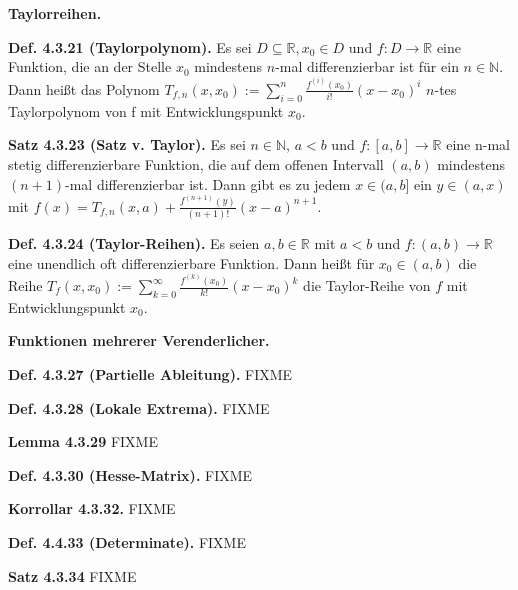 \textbf{Taylorreihen.}

\textbf{Def. 4.3.21 (Taylorpolynom).} Es sei $D\subseteq\mathbb{R},x_{0}\in D$
und $f:D\rightarrow\mathbb{R}$ eine Funktion, die an der Stelle $x_{0}$
mindestens $n$-mal differenzierbar ist für ein $n\in\mathbb{N}.$
Dann heißt das Polynom $T_{f,n}(x,x_{0}):=\sum_{i=0}^{n}\frac{f^{(i)}(x_{0})}{i!}(x-x_{0})^{i}$
$n$-tes Taylorpolynom von f mit Entwicklungspunkt $x_{0}$.

\textbf{Satz 4.3.23 (Satz v. Taylor).} Es sei $n\in\mathbb{N}$, $a<b$
und $f:[a,b]\rightarrow\mathbb{R}$ eine n-mal stetig differenzierbare
Funktion, die auf dem offenen Intervall $(a,b)$ mindestens $(n+1)$-mal
differenzierbar ist. Dann gibt es zu jedem $x\in(a,b]$ ein $y\in(a,x)$
mit $f(x)=T_{f,n}(x,a)+\frac{f^{(n+1)}(y)}{(n+1)!}(x-a)^{n+1}$.


\textbf{Def. 4.3.24 (Taylor-Reihen).} Es seien $a,b\in\mathbb{R}$
mit $a<b$ und $f:(a,b)\rightarrow\mathbb{R}$ eine unendlich oft
differenzierbare Funktion. Dann heißt für $x_{0}\in(a,b)$ die Reihe
$T_{f}(x,x_{0}):=\sum_{k=0}^{\infty}\frac{f^{(k)}(x_{0})}{k!}(x-x_{0})^{k}$
die Taylor-Reihe von $f$ mit Entwicklungspunkt $x_{0}$.

\textbf{Funktionen mehrerer Verenderlicher.}

\textbf{Def. 4.3.27 (Partielle Ableitung).} FIXME

\textbf{Def. 4.3.28 (Lokale Extrema).} FIXME

\textbf{Lemma 4.3.29} FIXME

\textbf{Def. 4.3.30 (Hesse-Matrix).} FIXME

\textbf{Korrollar 4.3.32.} FIXME

\textbf{Def. 4.4.33 (Determinate).} FIXME

\textbf{Satz 4.3.34} FIXME

